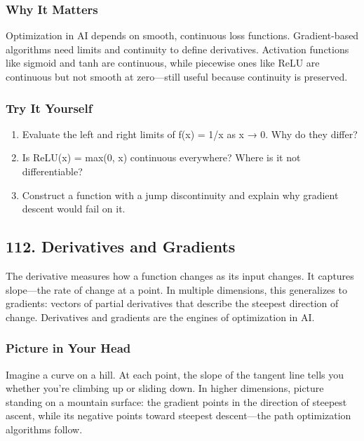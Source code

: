 \documentclass[
  letterpaper,
  DIV=11,
  numbers=noendperiod]{scrreprt}
\providecommand{\tightlist}{%
  \setlength{\itemsep}{0pt}\setlength{\parskip}{0pt}}
\begin{document}
\subsubsection{Why It Matters}\label{why-it-matters-8}

Optimization in AI depends on smooth, continuous loss functions.
Gradient-based algorithms need limits and continuity to define
derivatives. Activation functions like sigmoid and tanh are continuous,
while piecewise ones like ReLU are continuous but not smooth at
zero---still useful because continuity is preserved.

\subsubsection{Try It Yourself}\label{try-it-yourself-110}

\begin{enumerate}
\def\labelenumi{\arabic{enumi}.}
\tightlist
\item
  Evaluate the left and right limits of f(x) = 1/x as x → 0. Why do they
  differ?
\item
  Is ReLU(x) = max(0, x) continuous everywhere? Where is it not
  differentiable?
\item
  Construct a function with a jump discontinuity and explain why
  gradient descent would fail on it.
\end{enumerate}

\subsection{112. Derivatives and
Gradients}\label{derivatives-and-gradients}

The derivative measures how a function changes as its input changes. It
captures slope---the rate of change at a point. In multiple dimensions,
this generalizes to gradients: vectors of partial derivatives that
describe the steepest direction of change. Derivatives and gradients are
the engines of optimization in AI.

\subsubsection{Picture in Your Head}\label{picture-in-your-head-111}

Imagine a curve on a hill. At each point, the slope of the tangent line
tells you whether you're climbing up or sliding down. In higher
dimensions, picture standing on a mountain surface: the gradient points
in the direction of steepest ascent, while its negative points toward
steepest descent---the path optimization algorithms follow.
\end{document}
